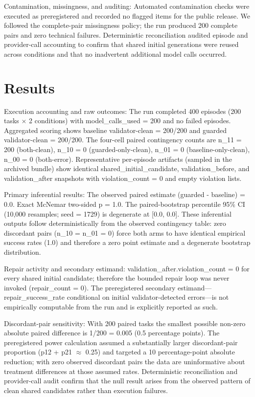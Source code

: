 \documentclass[conference]{IEEEtran}
\begin{document}
Contamination, missingness, and auditing: Automated contamination checks were executed as preregistered and recorded no flagged items for the public release. We followed the complete-pair missingness policy; the run produced 200 complete pairs and zero technical failures. Deterministic reconciliation audited episode and provider-call accounting to confirm that shared initial generations were reused across conditions and that no inadvertent additional model calls occurred.

\section{Results}
Execution accounting and raw outcomes: The run completed 400 episodes (200 tasks \ensuremath{\times} 2 conditions) with model\_calls\_used = 200 and no failed episodes. Aggregated scoring shows baseline validator-clean = 200/200 and guarded validator-clean = 200/200. The four-cell paired contingency counts are n\_11 = 200 (both-clean), n\_10 = 0 (guarded-only-clean), n\_01 = 0 (baseline-only-clean), n\_00 = 0 (both-error). Representative per-episode artifacts (sampled in the archived bundle) show identical shared\_initial\_candidate, validation\_before, and validation\_after snapshots with violation\_count = 0 and empty violation lists.

Primary inferential results: The observed paired estimate (guarded - baseline) = 0.0. Exact McNemar two-sided p = 1.0. The paired-bootstrap percentile 95\% CI (10,000 resamples; seed = 1729) is degenerate at [0.0, 0.0]. These inferential outputs follow deterministically from the observed contingency table: zero discordant pairs (n\_10 = n\_01 = 0) force both arms to have identical empirical success rates (1.0) and therefore a zero point estimate and a degenerate bootstrap distribution.

Repair activity and secondary estimand: validation\_after.violation\_count = 0 for every shared initial candidate; therefore the bounded repair loop was never invoked (repair\_count = 0). The preregistered secondary estimand---repair\_success\_rate conditional on initial validator-detected errors---is not empirically computable from the run and is explicitly reported as such.

Discordant-pair sensitivity: With 200 paired tasks the smallest possible non-zero absolute paired difference is 1/200 = 0.005 (0.5 percentage points). The preregistered power calculation assumed a substantially larger discordant-pair proportion (p12 + p21 \ensuremath{\approx} 0.25) and targeted a 10 percentage-point absolute reduction; with zero observed discordant pairs the data are uninformative about treatment differences at those assumed rates. Deterministic reconciliation and provider-call audit confirm that the null result arises from the observed pattern of clean shared candidates rather than execution failures.
\end{document}
